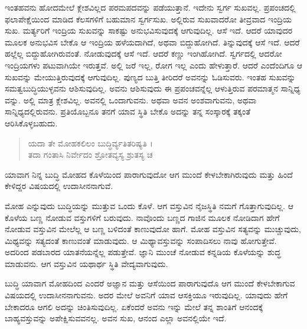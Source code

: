 ಇಂತಹವನು ಹೋದಮೇಲೆ ಕ್ಲೇಶವಿಲ್ಲದ ಪರಮಪದವನ್ನು ಪಡೆಯುತ್ತಾನೆ. ಇದೇನು ಸ್ವರ್ಗ ಸುಖವಲ್ಲ. ಪ್ರಪಂಚದಲ್ಲಿ ಫಲಾಪೇಕ್ಷೆಯಿಂದ ಮಾಡಿದ ಕೆಲಸಗಳಿಗೆ ಬಹುಮಾನ ಸ್ವರ್ಗಸುಖ. ಅಲ್ಲಿರುವ ಸುಖವಾದರೋ ತೀವ್ರವಾದ ಇಂದ್ರಿಯ ಸುಖ. ಮರ್ತ್ಯರಿಗೆ ಇಂದ್ರಿಯ ಸುಖವನ್ನು ಸಾಕಷ್ಟು ಅನುಭವಿಸುವುದಕ್ಕೆ ಆಗುವುದಿಲ್ಲ. ಆಸೆ ಇದೆ. ಆದರೆ ಯಾವುದರ ಮೂಲಕ ಅನುಭವಿಸ ಬೇಕೊ ಆ ಇಂದ್ರಿಯ ಹಳೆಯದಾಗಿದೆ, ಅಥವಾ ಬಿದ್ದುಹೋಗಿದೆ. ತಿನ್ನುವುದಕ್ಕೆ ಆಸೆ ಇದೆ. ಆದರೆ ಹಲ್ಲೆಲ್ಲ ಬಿದ್ದುಹೋಗಿರುವಂತೆ. ನೋಡುವುದಕ್ಕೆ ಆಸೆ ಇದೆ. ಆದರೆ ಕಣ್ಣು ಇಂಗಿಹೋಗಿದೆ. ಸ್ವರ್ಗದಲ್ಲಿ ಆದರೋ ಇಂದ್ರಿಯಗಳು ಪಟುವಾಗಿಯೇ ಇರುತ್ತವೆ. ಅಲ್ಲಿ ಜರೆ ಇಲ್ಲ, ರೋಗ ಇಲ್ಲ ಎಂದು ಹೇಳುತ್ತಾರೆ. ಆದರೆ ಎಂದೆಂದಿಗೂ ಆ ಸುಖವನ್ನು ಮೇಯುತ್ತಿರುವುದಕ್ಕೆ ಆಗುವುದಿಲ್ಲ. ಪುಣ್ಯದ ಬುತ್ತಿ ತೀರಿದರೆ ಅವನನ್ನು ಓಡಿಸುವರು. ಇಂತಹ ಸುಖವನ್ನು ಸಮತ್ವಬುದ್ಧಿಯುಳ್ಳವನು ಆಶಿಸುವುದಿಲ್ಲ. ಅವನು ಆಶಿಸುವುದು ಈ ಪ್ರಪಂಚವನ್ನೆಲ್ಲ ಆಳುತ್ತಿರುವ ಪರಮಾತ್ಮನ ಸಾನ್ನಿಧ್ಯ ವನ್ನು. ಅಲ್ಲಿ ಮಾತ್ರ ಕ್ಲೇಶವಿಲ್ಲ. ಅವನಲ್ಲಿ ಒಂದಾಗುವನು. ಅಥವಾ ಅವನ ಅಂಶವಾಗುವನು, ಅಥವಾ ಸಾನ್ನಿಧ್ಯದಲ್ಲಿರುವನು. ಪ್ರತಿಯೊಬ್ಬನೂ ತನಗೆ ಯಾವ ಸ್ಥಿತಿ ಬೇಕೊ ಅದನ್ನು ತನ್ನ ಸಂಸ್ಕಾರಕ್ಕೆ ತಕ್ಕಂತೆ ಆರಿಸಿಕೊಳ್ಳಬಹುದು.

\begin{verse}
ಯದಾ ತೇ ಮೋಹಕಲಿಲಂ ಬುದ್ಧಿರ್ವ್ಯತಿತರಿಷ್ಯತಿ ।\\ತದಾ ಗಂತಾಸಿ ನಿರ್ವೇದಂ ಶ್ರೋತವ್ಯಸ್ಯ ಶ್ರುತಸ್ಯ ಚ 
\end{verse}

{\small ಯಾವಾಗ ನಿನ್ನ ಬುದ್ಧಿ ಮೋಹದ ಕೊಳೆಯಿಂದ ಪಾರಾಗುವುದೋ ಆಗ ಮುಂದೆ ಕೇಳಬೇಕಾಗಿರುವುದು ಮತ್ತು ಹಿಂದೆ ಕೇಳಿದ್ದರ ವಿಷಯದಲ್ಲಿ ಉದಾಸೀನನಾಗುವೆ.}

ಮೋಹ ಎನ್ನುವುದು ಬುದ್ಧಿಯನ್ನು ಮುತ್ತುವ ಒಂದು ಕೊಳೆ. ಆಗ ವಸ್ತುವಿನ ನೈಜಸ್ಥಿತಿ ನಮಗೆ ಗೊತ್ತಾಗುವುದಿಲ್ಲ. ಆ ಕೊಳೆಯ ಬಣ್ಣ ನೋಡುವ ವಸ್ತುಗಳಿಗೆ ಬರುವುದು. ನಾವೊಂದು ಬಣ್ಣದ ಗಾಜಿನ ಮೂಲಕ ನೋಡಿದಾಗ ಹೇಗೆ ನೋಡುವ ವಸ್ತುವಿನ ಮೇಲೆಲ್ಲ ಆ ಬಣ್ಣ ಬಳಿದಂತೆ ಕಾಣುವುದೋ ಹಾಗೆ. ಮೋಹ ವಸ್ತುವಿನ ಸತ್ಯವನ್ನು ಮುಚ್ಚುವುದು, ಮಿಥ್ಯವನ್ನು ಸತ್ಯದಂತೆ ಕಾಣುವಂತೆ ಮಾಡುವುದು. ಆ ಮಿಥ್ಯಾವಸ್ತುವನ್ನು ಸಂಪಾದಿಸಲು ನಾವು ಹೋಗುತ್ತೇವೆ. ಅದರಿಂದ ಪಡಬಾರದ ಯಾತನೆಯನ್ನೆಲ್ಲ ಪಡುತ್ತೇವೆ. ಜ್ಞಾನಿ ಮುಂಚೆ ನೋಡುವ ಕನ್ನಡಿಯ ಕೊಳೆಯನ್ನು ಶುದ್ಧ ಮಾಡುವನು. ಆಗ ವಸ್ತುವಿನ ಯಥಾರ್ಥ ಸ್ಥಿತಿ ವೇದ್ಯವಾಗುವುದು.

ಬುದ್ಧಿ ಯಾವಾಗ ಮೋಹದಿಂದ ಎಂದರೆ ಅಜ್ಞಾನ ಮತ್ತು ಆಸೆಯಿಂದ ಪಾರಾಗುವುದೊ ಆಗ ಮುಂದೆ ಕೇಳಬೇಕಾಗುವ ವಿಷಯದಲ್ಲಿ ಉದಾಸೀನನಾಗುವನು. ಅದರ ಮೇಲೆ ಅವನಿಗೆ ಯಾವ ಆಸಕ್ತಿಯೂ ಇರುವುದಿಲ್ಲ. ಯಾವುದು ಹೇಗೆ ಬೇಕಾದರೂ ಆಗಲಿ ಅದನ್ನು ಚಿಂತಿಸುವುದಿಲ್ಲ. ಏಕೆಂದರೆ ಅವನು ಇನ್ನು ಮೇಲೆ ತನ್ನ ಶಾಂತಿಗೆ ಆನಂದಕ್ಕೆ ಬಾಹ್ಯವಸ್ತುವನ್ನು ಅಪೇಕ್ಷಿಸುವವನಲ್ಲ. ಅವನ ಸುಖ, ಆನಂದ ಎಲ್ಲಾ ಅವನಲ್ಲಿಯೇ ಇದೆ.

